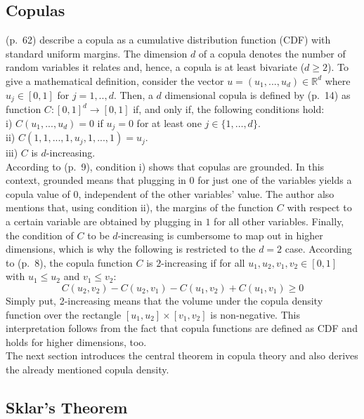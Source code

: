 \documentclass[
]{krantz}
\begin{document}
\subsection{Copulas}\label{cops}

\citet{zhang2019} (p.~62) describe a copula as a cumulative distribution
function (CDF) with standard uniform margins. The dimension \(d\) of a copula
denotes the number of random variables it relates and, hence, a copula is at least bivariate (\(d \geq 2\)).
To give a mathematical definition, consider the vector
\(u = (u_1, ..., u_d) \in \mathbb{R}^d\) where \(u_j \in [0, 1]\) for
\(j = 1, .., d\). Then, a \(d\) dimensional copula is defined by
\citet{durante2016} (p.~14) as function \(C:[0,1]^d\to [0,1]\) if, and only if,
the following conditions hold:\\
i) \(C(u_1, ..., u_d) = 0\) if \(u_j = 0\) for at least one
\(j \in \{1,…,d\}\).\\
ii) \(C(1, 1, ..., 1, u_j, 1, ..., 1) = u_j\).\\
iii) \(C\) is \(d\)-increasing.\\
According to \citet{nelsen2006} (p.~9), condition i) shows that copulas
are grounded. In this context, grounded means that
plugging in \(0\) for just one of the variables yields a copula value of \(0\), independent of the
other variables' value.
The author also mentions that, using condition ii), the margins of the function \(C\) with respect to a certain variable are obtained by
plugging in \(1\) for all other variables.
Finally, the condition of \(C\) to be \(d\)-increasing is cumbersome to map out in
higher dimensions, which is why the following is restricted to the \(d = 2\) case.
According to \citet{nelsen2006} (p.~8), the copula function \(C\) is
\(2\)-increasing if for all \(u_1, u_2, v_1, v_2 \in [0,1]\) with
\(u_1 \leq u_2\) and \(v_1 \leq v_2\):\\
\[
C(u_2, v_2) - C(u_2, v_1) - C(u_1, v_2) + C(u_1, v_1) \geq 0
\label{eq:twoincreasing}
\]
Simply put, 2-increasing means that the volume under the copula density
function over the rectangle \([u_1, u_2] \times [v_1, v_2]\) is
non-negative. This interpretation follows from the fact that copula functions are defined as CDF and holds for higher dimensions, too.\\
The next section introduces the central theorem in copula theory and also derives the already mentioned copula density.

\subsection{Sklar's Theorem}\label{sklarstheorem}
\end{document}
